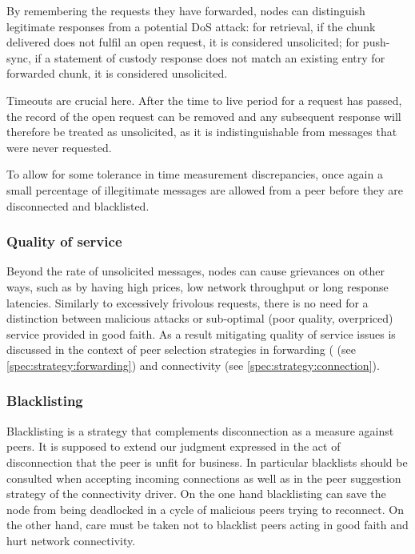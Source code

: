 % 
%

By remembering the requests they have forwarded, nodes can distinguish legitimate responses from a potential DoS attack: for retrieval, if the chunk delivered does not fulfil an open request, it is considered unsolicited; for push-sync, if a statement of custody response does not match an existing entry for forwarded chunk, it is considered unsolicited.

Timeouts are crucial here. After the time to live period for a request has passed, the record of the open request can be removed and any subsequent response will therefore be treated as unsolicited, as it is indistinguishable from messages that were never requested. 

To allow for some tolerance in time measurement discrepancies, once again a small percentage of illegitimate messages are allowed from a peer before they are disconnected and blacklisted.

\subsubsection{Quality of service}

Beyond the rate of unsolicited messages, nodes can cause grievances on other ways, such as by having high prices, low network throughput or long response latencies. Similarly to excessively frivolous requests, there is no need for a distinction between malicious attacks or sub-optimal (poor quality, overpriced) service provided in good faith. As a result mitigating quality of service issues is discussed in the context of peer selection strategies in forwarding ( (see \ref{spec:strategy:forwarding}) and connectivity (see \ref{spec:strategy:connection}).

\subsubsection{Blacklisting}

Blacklisting is a strategy that complements disconnection as a measure against peers. It is supposed to extend our judgment expressed in the act of disconnection that the peer is unfit for business.
In particular blacklists should be consulted when accepting incoming connections as well as in the peer suggestion strategy of the connectivity driver. On the one hand blacklisting can save the node from being deadlocked in a cycle of malicious peers trying to reconnect. On the other hand, care must be taken not to blacklist peers acting in good faith and hurt network connectivity.



